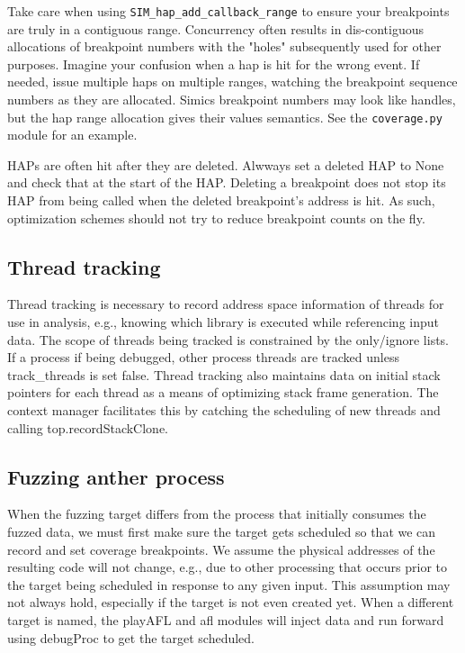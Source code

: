 \documentclass[titlepage]{article}
\begin{document}
\begin{appendices}
Take care when using {\tt SIM\_hap\_add\_callback\_range} to ensure your breakpoints are truly in a contiguous range.
Concurrency often results in dis-contiguous allocations of breakpoint numbers with the "holes" subsequently used for other purposes.
Imagine your confusion when a hap is hit for the wrong event.  If needed, issue multiple haps on multiple ranges, watching the
breakpoint sequence numbers as they are allocated.  Simics breakpoint numbers may look like handles, but the hap range allocation 
gives their values semantics.  See the {\tt coverage.py} module for an example.

HAPs are often hit after they are deleted.  Alwways set a deleted HAP to None and check that at the start of the HAP.
Deleting a breakpoint does not stop its HAP from being called when the deleted breakpoint's address is hit.  As such,
optimization schemes should not try to reduce breakpoint counts on the fly.

\subsection{Thread tracking}
Thread tracking is necessary to record address space information of threads for use in analysis, e.g., knowing which library
is executed while referencing input data.  The scope of threads being tracked is constrained by the only/ignore lists. 
If a process if being debugged, other process threads are tracked unless track\_threads is set false.  Thread tracking also maintains
data on initial stack pointers for each thread as a means of optimizing stack frame generation.  The context manager facilitates this 
by catching the scheduling of new threads and calling top.recordStackClone.

\subsection{Fuzzing anther process}
When the fuzzing target differs from the process that initially consumes the fuzzed data, we must first make
sure the target gets scheduled so that we can record and set coverage breakpoints.  We assume the physical addresses
of the resulting code will not change, e.g., due to other processing that occurs prior to the target being scheduled
in response to any given input.  This assumption may not always hold, especially if the target is not even created yet.
When a different target is named, the playAFL and afl modules will inject data and run forward using debugProc to get
the target scheduled.


\end{appendices}
\end{document}
